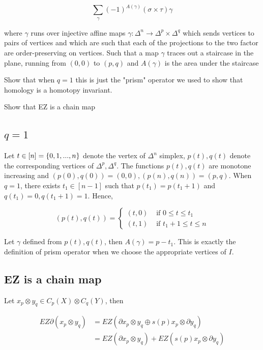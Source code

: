 \documentclass{article}
\begin{document}
$$
    \sum_\gamma (-1)^{A(\gamma)} (\sigma \times \tau) \gamma
$$

where $\gamma$ runs over injective affine maps $\gamma: \Delta^n \to \Delta^p \times \Delta^q$ which sends vertices to pairs of vertices and which are such that each of the projections to the two factor are order-preserving on vertices. Such that a map $\gamma$ traces out a staircase in the plane, running from $(0, 0)$ to $(p, q)$ and $A(\gamma)$ is the area under the staircase

Show that when $q=1$ this is just the "prism" operator we used to show that homology is a homotopy invariant.

Show that EZ is a chain map

\subsection{$q = 1$}

Let $t \in [n] = \{0, 1, ..., n\}$ denote the vertex of $\Delta^n$ simplex, $p(t), q(t)$ denote the corresponding vertices of $\Delta^p, \Delta^q$. The functions $p(t), q(t)$ are monotone increasing and $(p(0), q(0)) = (0, 0), (p(n), q(n)) = (p, q)$. When $q = 1$, there exists $t_1 \in [n-1]$ such that $p(t_1) = p(t_1 + 1)$ and $q(t_1) = 0, q(t_1+1) = 1$. Hence,

$$
    (p(t), q(t)) = \begin{cases}
        (t, 0) &\text{ if } 0 \leq t \leq t_1 \\
        (t, 1) &\text{ if } t_1 + 1 \leq t \leq n
    \end{cases}
$$

Let $\gamma$ defined from $p(t), q(t)$, then $A(\gamma) = p - t_1$. This is exactly the definition of prism operator when we choose the appropriate vertices of $I$.

\subsection{EZ is a chain map}

Let $x_p \otimes y_q \in C_p(X) \otimes C_q(Y)$, then 

\begin{align*}
    EZ \partial (x_p \otimes y_q)
    &= EZ(\partial x_p \otimes y_q \oplus s(p) x_p \otimes \partial y_q) \\
    &= EZ(\partial x_p \otimes y_q) + EZ(s(p) x_p \otimes \partial y_q)
\end{align*}
\end{document}
